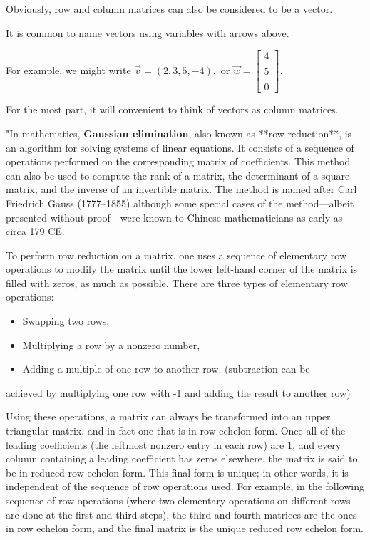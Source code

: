 Obviously, row and column matrices can also be considered to be a
vector.

It is common to name vectors using variables with arrows above.

For example, we might write $\vec{v}=(2, 3, 5, -4),\textrm{ or } \vec{w}=
\begin{bmatrix} 4 \\\\ 5 \\\\ 0 
\end{bmatrix}$.

For the most part, it will convenient to think of vectors as column
matrices.

"In mathematics, \textbf{Gaussian elimination}, also known as **row
reduction**, is an algorithm for solving systems of linear equations. It
consists of a sequence of operations performed on the corresponding
matrix of coefficients. This method can also be used to compute the rank
of a matrix, the determinant of a square matrix, and the inverse of an
invertible matrix. The method is named after Carl Friedrich Gauss
(1777–1855) although some special cases of the method—albeit presented
without proof—were known to Chinese mathematicians as early as circa
179 CE.

To perform row reduction on a matrix, one uses a sequence of elementary
row operations to modify the matrix until the lower left-hand corner of
the matrix is filled with zeros, as much as possible. There are three
types of elementary row operations:

\begin{itemize}
    \item Swapping two rows,
    \item Multiplying a row by a nonzero number,
    \item Adding a multiple of one row to another row. (subtraction can be
\end{itemize}
    achieved by multiplying one row with -1 and adding the result to
    another row)

Using these operations, a matrix can always be transformed into an upper
triangular matrix, and in fact one that is in row echelon form. Once all
of the leading coefficients (the leftmost nonzero entry in each row) are
1, and every column containing a leading coefficient has zeros
elsewhere, the matrix is said to be in reduced row echelon form. This
final form is unique; in other words, it is independent of the sequence
of row operations used. For example, in the following sequence of row
operations (where two elementary operations on different rows are done
at the first and third steps), the third and fourth matrices are the
ones in row echelon form, and the final matrix is the unique reduced row
echelon form.

